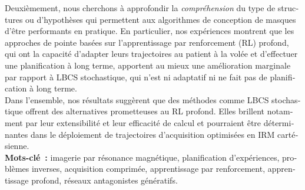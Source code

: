 \begin{otherlanguage}{french}
Deuxièmement, nous cherchons à approfondir la \textit{compréhension} du type de structures ou d'hypothèses qui permettent aux algorithmes de conception de masques d'être performants en pratique. En particulier, nos expériences montrent que les approches de pointe basées sur l'apprentissage par renforcement (RL) profond, qui ont la capacité d'adapter leurs trajectoires au patient à la volée et d'effectuer une planification à long terme, apportent au mieux une amélioration marginale par rapport à LBCS stochastique, qui n'est ni adaptatif ni ne fait pas de planification à long terme.\\

Dans l'ensemble, nos résultats suggèrent que des méthodes comme LBCS stochastique offrent des alternatives prometteuses au RL profond. Elles brillent notamment par leur extensibilité et leur efficacité de calcul et pourraient être déterminantes dans le déploiement de trajectoires d'acquisition optimisées en IRM cartésienne.\\

\textbf{Mots-clé~:} imagerie par résonance magnétique, planification d'expériences, problèmes inverses, acquisition comprimée, apprentissage par renforcement, apprentissage profond, réseaux antagonistes génératifs.


\end{otherlanguage}


